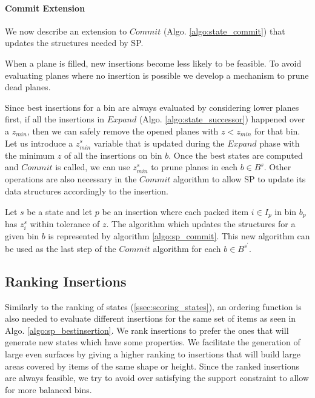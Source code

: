 \paragraph*{Commit Extension}
We now describe an extension to $Commit$ (Algo. \ref{algo:state_commit}) that updates the structures needed by SP.

When a plane is filled, new insertions become less likely to be feasible.
To avoid evaluating planes where no insertion is possible we develop a mechanism to prune dead planes.

Since best insertions for a bin are always evaluated by considering lower planes first, if all the insertions in $Expand$ (Algo. \ref{algo:state_successor}) happened over a $z_{min}$, then we can safely remove the opened planes with $z < z_{min}$ for that bin.
Let us introduce a $z^s_{min}$ variable that is updated during the $Expand$ phase with the minimum $z$ of all the insertions on bin $b$.
Once the best states are computed and $Commit$ is called, we can use $z^s_{min}$ to prune planes in each $b \in B^s$.
Other operations are also necessary in the $Commit$ algorithm to allow SP to update its data structures accordingly to the insertion.

Let $s$ be a state and let $p$ be an insertion where each packed item $i \in I_p$ in bin $b_p$ has $z^s_i$ within tolerance of $z$.
The algorithm which updates the structures for a given bin $b$ is represented by algorithm \ref{algo:sp_commit}.
This new algorithm can be used as the last step of the $Commit$ algorithm for each $b \in B^{s^\prime}$.



\subsection{Ranking Insertions}
\label{ssec:scoring_insertions}%
Similarly to the ranking of states (\cref{ssec:scoring_states}), an ordering function is also needed to evaluate different insertions for the same set of items as seen in Algo. \ref{algo:sp_bestinsertion}.
We rank insertions to prefer the ones that will generate new states which have some properties.
We facilitate the generation of large even surfaces by giving a higher ranking to insertions that will build large areas covered by items of the same shape or height.
Since the ranked insertions are always feasible, we try to avoid over satisfying the support constraint to allow for more balanced bins.

